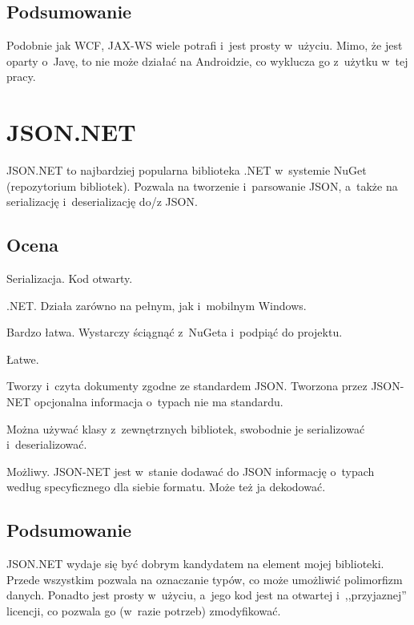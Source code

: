 \subsection{Podsumowanie}
Podobnie jak WCF, JAX-WS wiele potrafi i~jest prosty w~użyciu.
Mimo, że jest oparty o~Javę, to nie może działać na Androidzie, co wyklucza go z~użytku w~tej pracy.



\section{JSON.NET}
JSON.NET to najbardziej popularna biblioteka .NET w~systemie NuGet (repozytorium bibliotek).
Pozwala na tworzenie i~parsowanie JSON, a~także na serializację i~deserializację do/z JSON.

\subsection{Ocena}
 
\begin{description}
Serializacja. Kod otwarty.

.NET. Działa zarówno na pełnym, jak i~mobilnym Windows.

Bardzo łatwa. Wystarczy ściągnąć z~NuGeta i~podpiąć do projektu.

Łatwe.

Tworzy i~czyta dokumenty zgodne ze standardem JSON.
Tworzona przez JSON-NET opcjonalna informacja o~typach nie ma standardu.

Można używać klasy z~zewnętrznych bibliotek, swobodnie je serializować i~deserializować.

Możliwy.
JSON-NET jest w~stanie dodawać do JSON informację o~typach według specyficznego dla siebie formatu.
Może też ja dekodować.
\end{description}

\subsection{Podsumowanie}
JSON.NET wydaje się być dobrym kandydatem na element mojej biblioteki.
Przede wszystkim pozwala na oznaczanie typów, co może umożliwić polimorfizm danych.
Ponadto jest prosty w~użyciu, a~jego kod jest na otwartej i~,,przyjaznej'' licencji, co pozwala go (w~razie potrzeb) zmodyfikować.



